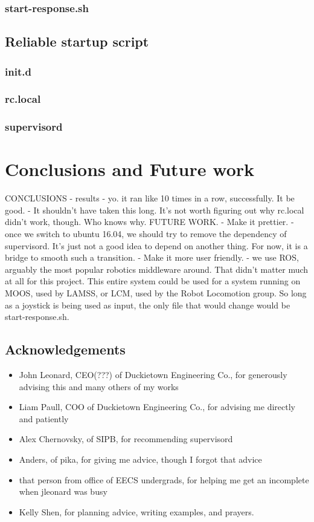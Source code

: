 \documentclass[titlepage]{article}
\begin{document}
\subsubsection{start-response.sh}
\subsection{Reliable startup script} %
\subsubsection{init.d}
\subsubsection{rc.local}
\subsubsection{supervisord}
\section{Conclusions and Future work}
CONCLUSIONS
- results
- yo. it ran like 10 times in a row, successfully. It be good.
- It shouldn't have taken this long. It's not worth figuring out why
  rc.local didn't work, though. Who knows why.
FUTURE WORK. 
- Make it prettier. 
- once we switch to ubuntu 16.04, we should try to remove the dependency of supervisord. It's just not a good idea to depend on another thing. For now, it is a bridge to smooth such a transition. 
- Make it more user friendly. 
- we use ROS, arguably the most popular robotics middleware around. That didn't matter much at all for this project. This entire system could be used for a system running on MOOS, used by LAMSS, or LCM, used by the Robot Locomotion group. So long as a joystick is being used as input, the only file that would change would be start-response.sh.
\subsection{Acknowledgements}
\begin{itemize}
\item John Leonard, CEO(???) of Duckietown Engineering Co., for generously advising this and many others of my works
\item Liam Paull, COO of Duckietown Engineering Co., for advising me directly and patiently
\item Alex Chernovsky, of SIPB, for recommending supervisord
\item Anders, of pika, for giving me advice, though I forgot that advice
\item that person from office of EECS undergrads, for helping me get an incomplete when jleonard was busy
\item Kelly Shen, for planning advice, writing examples, and prayers. 
\end{itemize}
\end{document}
